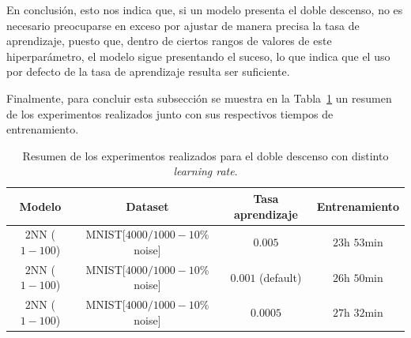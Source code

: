 En conclusión, esto nos indica que, si un modelo presenta el doble descenso, no es necesario preocuparse en exceso por ajustar de manera precisa la tasa de aprendizaje, puesto que, dentro de ciertos rangos de valores de este hiperparámetro, el modelo sigue presentando el suceso, lo que indica que el uso por defecto de la tasa de aprendizaje resulta ser suficiente.\newline

Finalmente, para concluir esta subsección se muestra en la Tabla~\ref{tab:difflr} un resumen de los experimentos realizados junto con sus respectivos tiempos de entrenamiento.\newline

\begin{table}[h!]
    \centering
    \begin{tabular}{|c|c|c|c|}
    \hline
    \textbf{Modelo}       & \textbf{Dataset} & \textbf{Tasa aprendizaje} & \textbf{Entrenamiento} \\ 
    \hline
    $2$NN ($1-100$)     & MNIST[$4000/1000 - 10$\% noise]      & $0.005$      & $23$h $53$min         \\ 
    $2$NN ($1-100$)     & MNIST[$4000/1000 - 10$\% noise]      & $0.001$ (default)      & $26$h $50$min     \\ 
    $2$NN ($1-100$)     & MNIST[$4000/1000 - 10$\% noise]      & $0.0005$      & $27$h $32$min         \\ 
    \hline
    \end{tabular}
    \caption[Resumen de los experimentos realizados para el doble descenso con distinto \textit{learning rate}.]{Resumen de los experimentos realizados para el doble descenso con distinto \textit{learning rate}.}\label{tab:difflr}
\end{table}

\endinput
